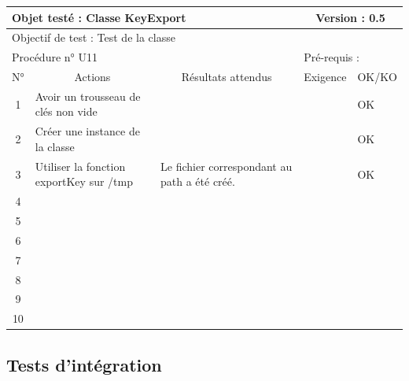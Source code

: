 \documentclass{../res/univ-projet}
\begin{document}
\begin{center}
    \begin{tabular}{|c|p{5cm}|p{5cm}|p{1.5cm}|p{1.5cm}|}
      \hline
      \multicolumn{3}{|l|}{Objet testé : Classe KeyExport} & \multicolumn{2}{c|}{Version : 0.5}\\ \hline
      \multicolumn{5}{|l|}{Objectif de test : Test de la classe}\\ \hline
      \multicolumn{3}{|l|}{Procédure n° U11} & \multicolumn{2}{p{3cm}|}{Pré-requis : }\\ \hline
      \multicolumn{1}{|c|}{N°} & \multicolumn{1}{c|}{Actions} & \multicolumn{1}{c|}{Résultats attendus} & 
      \multicolumn{1}{c|}{Exigence} & \multicolumn{1}{c|}{OK/KO}\\ \hline
      1 & Avoir un trousseau de clés non vide &  &  & OK \\
      2 & Créer une instance de la classe &  &  & OK \\
      3 & Utiliser la fonction exportKey sur /tmp & Le fichier correspondant au path a été créé. &  & OK \\
      4 &  &  &  &  \\
      5 &  &  &  &  \\
      6 &  &  &  &  \\
      7 &  &  &  & \\
      8 &  &  &  & \\
      9 &  &  &  & \\
      10 &  &  &  & \\ 
  \hline
    \end{tabular}
    \vskip 2.2cm

  


\subsection{Tests d'intégration}



\end{center}
\end{document}
